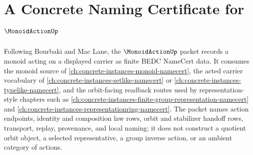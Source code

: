 \chapter{A Concrete Naming Certificate for $\MonoidActionUp$}
\label{ch:concrete-instances-monoid-action-namecert}

Following Bourbaki and Mac Lane, the $\MonoidActionUp$ packet records a monoid acting on a displayed carrier as finite BEDC NameCert data. It consumes the monoid source of \autoref{ch:concrete-instances-monoid-namecert}, the acted carrier vocabulary of \autoref{ch:concrete-instances-setlike-namecert} or \autoref{ch:concrete-instances-typelike-namecert}, and the orbit-facing readback routes used by representation-style chapters such as \autoref{ch:concrete-instances-finite-group-representation-namecert} and \autoref{ch:concrete-instances-representationring-namecert}. The packet names action endpoints, identity and composition law rows, orbit and stabilizer handoff rows, transport, replay, provenance, and local naming; it does not construct a quotient orbit object, a selected representative, a group inverse action, or an ambient category of actions.

